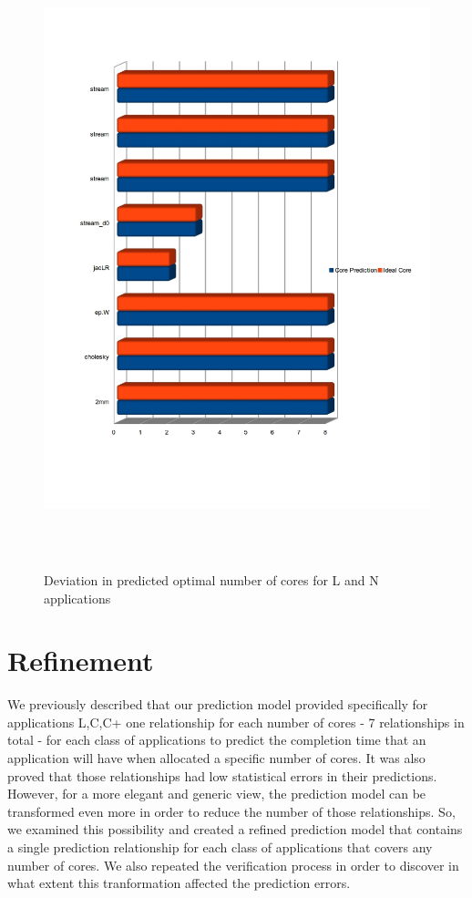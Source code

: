 \documentclass[diploma]{Styles/softlab-thesis}
\begin{document}
\begin{figure}[ht!]
\begin{center}
\includegraphics[width=160mm, height=180mm]{images/core-errors-LN.jpg}
\caption{Deviation in predicted optimal number of cores for L and N applications \label{overflow}}
\end{center}
\end{figure}

\cleardoublepage

\section{Refinement}

We previously described that our prediction model provided specifically for applications L,C,C+ one relationship for each number of cores - 7 relationships in total - for each class of applications to predict the completion time that an application will have when allocated a specific number of cores. It was also proved that those relationships had low statistical errors in their predictions. However, for a more elegant and generic view, the prediction model can be transformed even more in order to reduce the number of those relationships. So, we examined this possibility and created a refined prediction model that contains a single prediction relationship for each class of applications that covers any number of cores. We also repeated the verification process in order to discover in what extent this tranformation affected the prediction errors. \\
\end{document}

